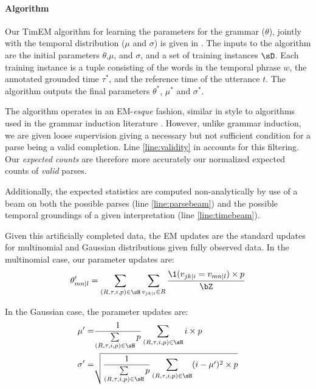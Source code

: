 \paragraph{Algorithm}
Our TimEM algorithm for learning the parameters for the grammar ($\theta$),
	jointly with the temporal distribution ($\mu$ and $\sigma$) is given 
	in .
The inputs to the algorithm are the initial parameters $\theta$,$\mu$, and
	$\sigma$, and a set of training instances $\sD$.
Each training instance is a tuple consisting of the words in the temporal
	phrase $w$, the annotated grounded time $\tau^*$, and the reference time
	of the utterance $t$.
The algorithm outputs the final parameters $\theta^*$, $\mu^*$ and $\sigma^*$.

The algorithm operates in an EM-\textit{esque} fashion, similar in style
	to algorithms used in the grammar induction
	literature \cite{key:2004klein-induction,key:1992carroll-induction}.
However, unlike grammar induction, we are given loose supervision giving a 
	necessary but not sufficient condition for a parse being a valid completion.
Line \ref{line:validity} in  accounts for this filtering.
Our \textit{expected counts} are therefore more accurately our normalized
	expected counts of \textit{valid} parses.

Additionally, the expected statistics are computed non-analytically by use of
	a beam on both the possible parses (line \ref{line:parsebeam}) and the
	possible temporal groundings of a given interpretation (line
	\ref{line:timebeam}).

Given this artificially completed data, the EM updates are the standard
	updates for multinomial and Gaussian distributions given fully observed data.
In the multinomial case, our parameter updates are:
\begin{equation}
	\theta_{mn \mid l}' =
		\sum\limits_{(R,\tau,i,p) \in \sH} \sum\limits_{v_{jk \mid i} \in R}
		\frac{
			\1(v_{jk \mid i} = v_{mn \mid l}) \times p
		}{
			\bZ
		}
\label{eqn:multinomialEM}
\end{equation}

In the Gaussian case, the parameter updates are:
\begin{align}
	\mu' =&
		\frac{ 1 } { \sum\limits_{(R,\tau,i,p) \in \sH}  p }
		\sum\limits_{(R,\tau,i,p) \in \sH} i \times p \\
	\sigma' =& \sqrt{
		\frac{ 1 } { \sum\limits_{(R,\tau,i,p) \in \sH}  p }
		\sum\limits_{(R,\tau,i,p) \in \sH} (i-\mu')^2 \times p
	}
\label{eqn:multinomialEM}
\end{align}


